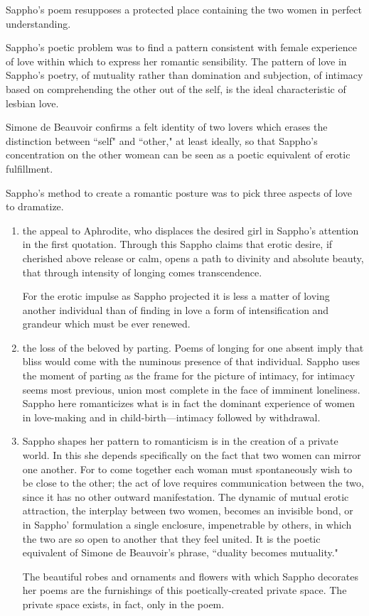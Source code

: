 Sappho's poem resupposes a protected place containing the two women in perfect understanding.

\begin{rmk}
    Sappho's poetic problem was to find a pattern consistent with female experience of love within which to express her romantic sensibility. The pattern of love in Sappho's poetry, of mutuality rather than domination and subjection, of intimacy based on comprehending the other out of the self, is the ideal characteristic of lesbian love.
\end{rmk}

Simone de Beauvoir confirms a felt identity of two lovers which erases the distinction between ``self" and ``other," at least ideally, so that Sappho's concentration on the other womean can be seen as a poetic equivalent of erotic fulfillment.

\begin{nte}
    Sappho's method to create a romantic posture was to pick three aspects of love to dramatize. \begin{enumerate}
        \item the appeal to Aphrodite, who displaces the desired girl in Sappho's attention in the first quotation. Through this Sappho claims that erotic desire, if cherished above release or calm, opens a path to divinity and absolute beauty, that through intensity of longing comes transcendence.

            For the erotic impulse as Sappho projected it is less a matter of loving another individual than of finding in love a form of intensification and grandeur which must be ever renewed.
        \item the loss of the beloved by parting. Poems of longing for one absent imply that bliss would come with the numinous presence of that individual. Sappho uses the moment of parting as the frame for the picture of intimacy, for intimacy seems most previous, union most complete in the face of imminent loneliness. Sappho here romanticizes what is in fact the dominant experience of women in love-making and in child-birth---intimacy followed by withdrawal.
        \item Sappho shapes her pattern to romanticism is in the creation of a private world. In this she depends specifically on the fact that two women can mirror one another. For to come together each woman must spontaneously wish to be close to the other; the act of love requires communication between the two, since it has no other outward manifestation. The dynamic of mutual erotic attraction, the interplay between two women, becomes an invisible bond, or in Sappho' formulation a single enclosure, impenetrable by others, in which the two are so open to another that they feel united. It is the poetic equivalent of Simone de Beauvoir's phrase, ``duality becomes mutuality."

            The beautiful robes and ornaments and flowers with which Sappho decorates her poems are the furnishings of this poetically-created private space. The private space exists, in fact, only in the poem.
    \end{enumerate}
\end{nte}

